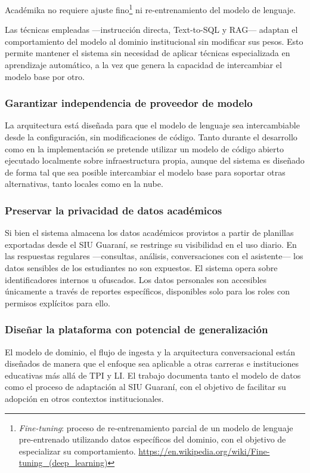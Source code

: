 \documentclass[
  spanish,
]{article}
\begin{document}
Académika no requiere ajuste fino\footnote{\emph{Fine-tuning}: proceso de re-entrenamiento parcial
de un modelo de lenguaje pre-entrenado utilizando datos específicos del dominio,
con el objetivo de especializar su comportamiento. \url{https://en.wikipedia.org/wiki/Fine-tuning_(deep_learning)}}
ni re-entrenamiento del modelo de lenguaje.

Las técnicas empleadas ---instrucción directa, Text-to-SQL y RAG--- adaptan el comportamiento del modelo
al dominio institucional sin modificar sus pesos.
Esto permite mantener el sistema sin necesidad de aplicar técnicas especializada en aprendizaje automático,
a la vez que genera la capacidad de intercambiar el modelo base por otro.

\subsubsection*{Garantizar independencia de proveedor de modelo}

La arquitectura está diseñada para que el  modelo de lenguaje sea intercambiable
desde la configuración, sin modificaciones de código.
Tanto durante el desarrollo como en la implementación se pretende utilizar un modelo de código abierto
ejecutado localmente sobre infraestructura propia,
aunque del sistema es diseñado de forma tal que sea posible
intercambiar el modelo base para soportar otras alternativas,
tanto locales como en la nube.

\subsubsection*{Preservar la privacidad de datos académicos}

Si bien el sistema almacena los datos académicos provistos a partir de
planillas exportadas desde el SIU Guaraní, se restringe su visibilidad en el uso diario.
En las respuestas regulares ---consultas, análisis, conversaciones con el asistente---
los datos sensibles de los estudiantes no son expuestos.
El sistema opera sobre identificadores internos u ofuscados.
Los datos personales son accesibles únicamente a través de reportes específicos,
disponibles solo para los roles con permisos explícitos para ello.

\subsubsection*{Diseñar la plataforma con potencial de generalización}

El modelo de dominio, el flujo de ingesta y la arquitectura conversacional están diseñados
de manera que el enfoque sea aplicable a otras carreras e instituciones educativas
más allá de TPI y LI.
El trabajo documenta tanto el modelo de datos como el proceso de adaptación al SIU Guaraní,
con el objetivo de facilitar su adopción en otros contextos institucionales.
\end{document}
